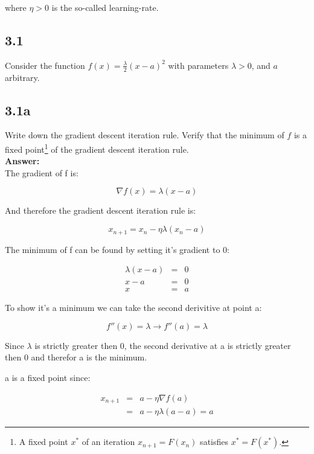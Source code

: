 \documentclass[a4paper]{article}
\begin{document}
where $\eta > 0$ is the so-called learning-rate.

\subsection*{3.1}

Consider the function $f(x) = \frac{\lambda}{2}(x - a)^2$ with parameters $\lambda > 0$, and $a$ arbitrary.


\subsection*{3.1a}

Write down the gradient descent iteration rule. Verify that the minimum of $f$ is a fixed point\footnote{A fixed point $x^*$ of an iteration $x_{n+1} = F(x_n)$ satisfies $x^* = F(x^*)$.} of the gradient descent iteration rule.\\

\textbf{Answer:}\\

The gradient of f is:

\begin{equation}
\nabla f(x) = \lambda (x-a)
\end{equation}

And therefore the gradient descent iteration rule is:

\begin{equation}
x_{n+1} = x_n - \eta \lambda (x_n-a)
\end{equation}

The minimum of f can be found by setting it's gradient to 0:

\begin{eqnarray}
\lambda(x-a) &=& 0\\
x-a &=& 0 \\
x &=& a
\end{eqnarray}

To show it's a minimum we can take the second derivitive at point a:

\begin{equation}
f''(x) = \lambda \rightarrow f''(a) = \lambda
\end{equation}

Since $\lambda$ is strictly greater then 0, the second derivative at a is strictly greater then 0 and therefor a is the minimum.

a is a fixed point since:

\begin{eqnarray}
x_{n+1} &=& a - \eta \nabla f(a)\\
&=& a - \eta \lambda (a-a) = a
\end{eqnarray}
\end{document}
